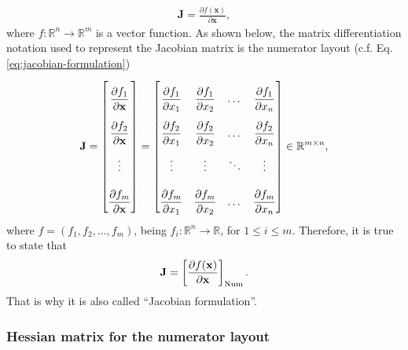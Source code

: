 \documentclass{article}
\begin{document}
\begin{align}
    \mathbf{J} = \frac{\partial f(\mathbf{x})}{\partial \mathbf{x}},
\end{align}
where \(f: \mathbb{R}^{n} \rightarrow \mathbb{R}^{m}\) is a vector function. As shown below, the matrix differentiation notation used to represent the Jacobian matrix is the numerator layout (c.f. Eq.\eqref{eq:jacobian-formulation})
\begin{align}
    \label{eq:jacobian-matrix}
    \mathbf{J} = \renewcommand{\arraystretch}{2.6} \begin{bmatrix}
        \dfrac{\partial f_1}{\partial \mathbf{x}} \\
        \dfrac{\partial f_2}{\partial \mathbf{x}} \\ 
        \vdots \\ 
        \dfrac{\partial f_m}{\partial \mathbf{x}}
    \end{bmatrix} = \begin{bmatrix}
        \dfrac{\partial f_1}{\partial x_1} & \dfrac{\partial f_1}{\partial x_2} & \dots & \dfrac{\partial f_1}{\partial x_n} \\
        \dfrac{\partial f_2}{\partial x_1} & \dfrac{\partial f_2}{\partial x_2} & \dots & \dfrac{\partial f_2}{\partial x_n} \\
        \vdots & \vdots & \ddots & \vdots \\
        \dfrac{\partial f_m}{\partial x_1} & \dfrac{\partial f_m}{\partial x_2} & \dots & \dfrac{\partial f_m}{\partial x_n} \\
    \end{bmatrix} \in \mathbb{R}^{m \times n},
\end{align}
where \(f = (f_1, f_2, \dots, f_m)\), being \(f_i: \mathbb{R}^n \rightarrow \mathbb{R}\), for \(1 \leq i \leq m\). Therefore, it is true to state that
\begin{align}
    \mathbf{J} = \left[ \frac{\partial f(\mathbf{x})}{\partial \mathbf{x}} \right]_{\textnormal{Num}}.
\end{align}
That is why it is also called ``Jacobian formulation''.

\subsubsection{Hessian matrix for the numerator layout}
\end{document}
